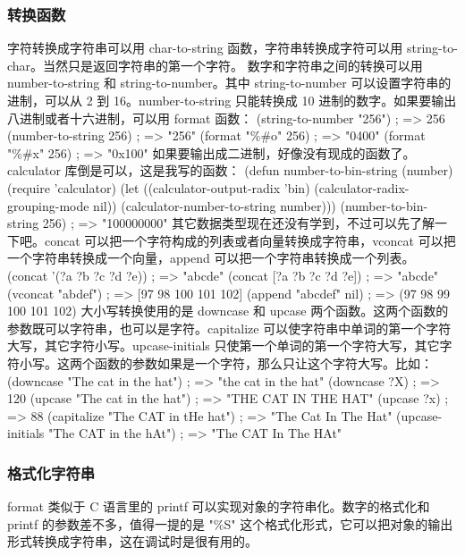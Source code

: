 \documentclass[11pt]{ctexart}
\begin{document}
\subsubsection{转换函数}
\label{sec:orgfcd561d}
字符转换成字符串可以用 char-to-string 函数，字符串转换成字符可以用 string-to-char。当然只是返回字符串的第一个字符。
数字和字符串之间的转换可以用 number-to-string 和 string-to-number。其中 string-to-number 可以设置字符串的进制，可以从 2 到 16。number-to-string 只能转换成 10 进制的数字。如果要输出八进制或者十六进制，可以用 format 函数：
(string-to-number "256")                ; => 256
(number-to-string 256)                  ; => "256"
(format "\%\#o" 256)                      ; => "0400"
(format "\%\#x" 256)                      ; => "0x100"
如果要输出成二进制，好像没有现成的函数了。calculator 库倒是可以，这是我写的函数：
(defun number-to-bin-string (number)
(require 'calculator)
(let ((calculator-output-radix 'bin)
(calculator-radix-grouping-mode nil))
(calculator-number-to-string number)))
(number-to-bin-string 256)              ; => "100000000"
其它数据类型现在还没有学到，不过可以先了解一下吧。concat 可以把一个字符构成的列表或者向量转换成字符串，vconcat 可以把一个字符串转换成一个向量，append 可以把一个字符串转换成一个列表。
(concat '(?a ?b ?c ?d ?e))              ; => "abcde"
(concat [?a ?b ?c ?d ?e])               ; => "abcde"
(vconcat "abdef")                       ; => [97 98 100 101 102]
(append "abcdef" nil)                   ; => (97 98 99 100 101 102)
大小写转换使用的是 downcase 和 upcase 两个函数。这两个函数的参数既可以字符串，也可以是字符。capitalize 可以使字符串中单词的第一个字符大写，其它字符小写。upcase-initials 只使第一个单词的第一个字符大写，其它字符小写。这两个函数的参数如果是一个字符，那么只让这个字符大写。比如：
(downcase "The cat in the hat")         ; => "the cat in the hat"
(downcase ?X)                           ; => 120
(upcase "The cat in the hat")           ; => "THE CAT IN THE HAT"
(upcase ?x)                             ; => 88
(capitalize "The CAT in tHe hat")       ; => "The Cat In The Hat"
(upcase-initials "The CAT in the hAt")  ; => "The CAT In The HAt"
\subsubsection{格式化字符串}
\label{sec:org147af0c}
format 类似于 C 语言里的 printf 可以实现对象的字符串化。数字的格式化和 printf 的参数差不多，值得一提的是 "\%S" 这个格式化形式，它可以把对象的输出形式转换成字符串，这在调试时是很有用的。
\end{document}
